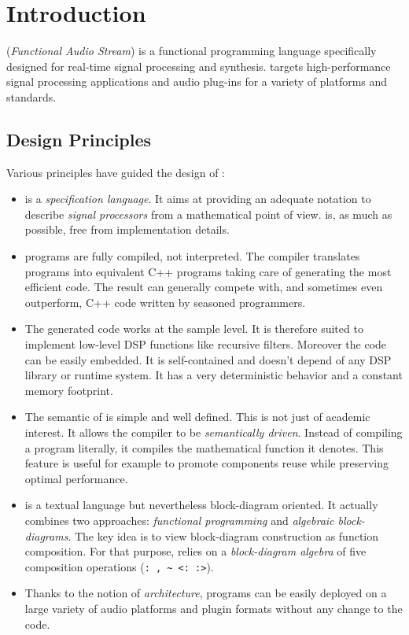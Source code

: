 \chapter{Introduction}
\label{introduction}


\faust (\textit{Functional Audio Stream}) is a functional programming language specifically designed for real-time signal processing and synthesis.  \faust targets high-performance signal processing applications and audio plug-ins for a variety of platforms and standards. 

\section{Design Principles} 

Various principles have guided the design of \faust :

\begin{itemize}

\item \faust is a \textit{specification language}. It aims at providing an adequate notation to describe \textit{signal processors} from a mathematical point of view. \faust is, as much as possible, free from implementation details. 

\item \faust programs are fully compiled, not interpreted. The compiler translates \faust programs into equivalent C++ programs taking care of generating the most efficient code. The result can generally compete with, and sometimes even outperform, C++ code written by seasoned programmers. 

\item The generated code works at the sample level. It is therefore suited to implement low-level DSP functions like recursive filters. Moreover the code can be easily embedded. It is self-contained and doesn't depend of any DSP library or runtime system. It has a very deterministic behavior and a constant memory footprint. 

\item The semantic of \faust is simple and well defined. This is not just of academic interest. It allows the \faust compiler to be \emph{semantically driven}. Instead of compiling a program literally, it compiles the mathematical function it denotes. This feature is useful for example to promote components reuse while preserving optimal performance.  

\item \faust is a textual language but nevertheless block-diagram oriented. It actually combines two approaches: \textit{functional programming} and \textit{algebraic block-diagrams}. The key idea is to view block-diagram construction as function composition. For that purpose, \faust relies on a \emph{block-diagram algebra} of five composition operations (\lstinline': , ~ <: :>').

\item Thanks to the notion of \textit{architecture}, \faust programs can be easily deployed on a large variety of audio platforms and plugin formats without any change to the \faust code.

\end{itemize}

